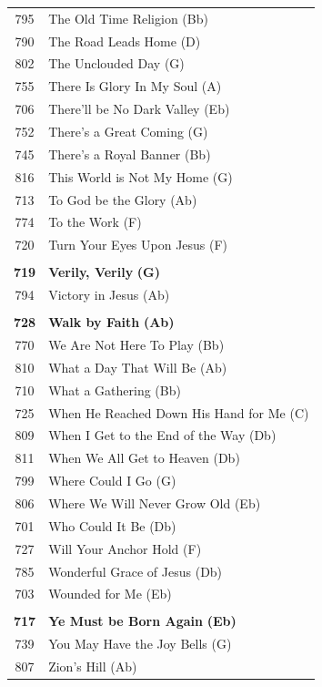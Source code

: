 \begin{supertabular}{c l}
795 & The Old Time Religion (Bb) \\
790 & The Road Leads Home (D) \\
802 & The Unclouded Day (G) \\
755 & There Is Glory In My Soul (A) \\
706 & There’ll be No Dark Valley (Eb) \\
752 & There’s a Great Coming (G) \\
745 & There’s a Royal Banner (Bb) \\
816 & This World is Not My Home (G) \\
713 & To God be the Glory (Ab) \\
774 & To the Work (F) \\
720 & Turn Your Eyes Upon Jesus (F) \\
 & \\
\textbf{719} & \textbf{Verily, Verily} \textbf{(G)} \\
794 & Victory in Jesus (Ab) \\
 & \\
\textbf{728} & \textbf{Walk by Faith} \textbf{(Ab)} \\
770 & We Are Not Here To Play (Bb) \\
810 & What a Day That Will Be (Ab) \\
710 & What a Gathering (Bb) \\
725 & When He Reached Down His Hand for Me (C) \\
809 & When I Get to the End of the Way (Db) \\
811 & When We All Get to Heaven (Db) \\
799 & Where Could I Go (G) \\
806 & Where We Will Never Grow Old (Eb) \\
701 & Who Could It Be (Db) \\
727 & Will Your Anchor Hold (F) \\
785 & Wonderful Grace of Jesus (Db) \\
703 & Wounded for Me (Eb) \\
 & \\
\textbf{717} & \textbf{Ye Must be Born Again} \textbf{(Eb)} \\
739 & You May Have the Joy Bells (G) \\
807 & Zion’s Hill (Ab) \\
\end{supertabular}
